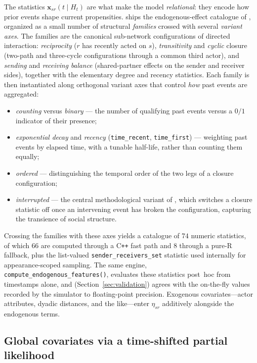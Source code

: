 The statistics $\mathbf{x}_{sr}(t \mid H_t)$ are what make the model
\emph{relational}: they encode how prior events shape current propensities.
 ships the endogenous-effect catalogue of
\citet{juozaitiene2024}, organized as a small number of structural
\emph{families} crossed with several \emph{variant axes}. The families are
the canonical sub-network configurations of directed interaction:
\emph{reciprocity} ($r$ has recently acted on $s$), \emph{transitivity}
and \emph{cyclic} closure (two-path and three-cycle configurations through
a common third actor), and \emph{sending} and \emph{receiving balance}
(shared-partner effects on the sender and receiver sides), together with
the elementary degree and recency statistics. Each family is then
instantiated along orthogonal variant axes that control \emph{how} past
events are aggregated:
\begin{itemize}
  \item \emph{counting} versus \emph{binary} --- the number of qualifying
    past events versus a $0/1$ indicator of their presence;
  \item \emph{exponential decay} and \emph{recency} (\texttt{time\_recent},
    \texttt{time\_first}) --- weighting past events by elapsed time, with a
    tunable half-life, rather than counting them equally;
  \item \emph{ordered} --- distinguishing the temporal order of the two
    legs of a closure configuration;
  \item \emph{interrupted} --- the central methodological variant of
    \citet{juozaitiene2024}, which switches a closure statistic off once an
    intervening event has broken the configuration, capturing the
    transience of social structure.
\end{itemize}
Crossing the families with these axes yields a catalogue of $74$ numeric
statistics, of which $66$ are computed through a C\texttt{++} fast path and
$8$ through a pure-R fallback, plus the list-valued
\texttt{sender\_receivers\_set} statistic used internally for
appearance-scoped sampling. The same engine,
\texttt{compute\_endogenous\_features()}, evaluates these statistics
post~hoc from timestamps alone, and (Section~\ref{sec:validation}) agrees
with the on-the-fly values recorded by the simulator to floating-point
precision. Exogenous covariates---actor attributes, dyadic distances, and
the like---enter $\eta_{sr}$ additively alongside the endogenous terms.

\subsection{Global covariates via a time-shifted partial likelihood}
\label{sec:global}

